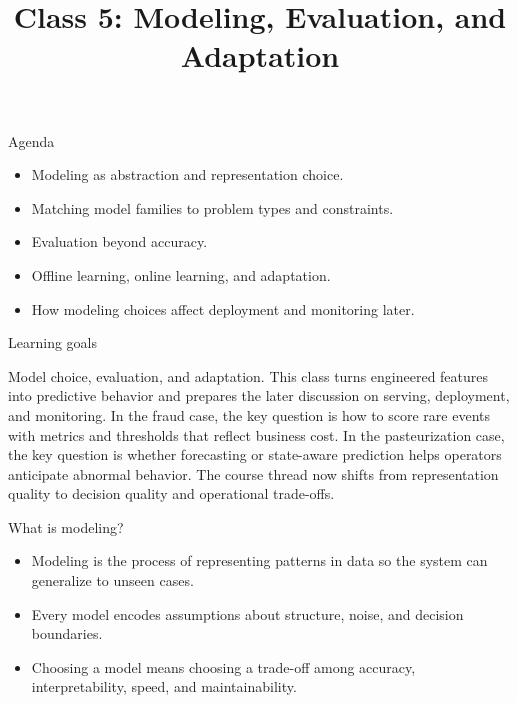 

\title{Class 5: Modeling, Evaluation, and Adaptation}
\author{\coursename}
\date{}



\frame{\titlepage \coursefooter}

\begin{frame}{Agenda}
\begin{itemize}
\item Modeling as abstraction and representation choice.
\item Matching model families to problem types and constraints.
\item Evaluation beyond accuracy.
\item Offline learning, online learning, and adaptation.
\item How modeling choices affect deployment and monitoring later.
\end{itemize}
\coursefooter
\end{frame}

\begin{frame}{Learning goals}
\coursefooter
\end{frame}

\coursecontextframe
{Model choice, evaluation, and adaptation.}
{This class turns engineered features into predictive behavior and prepares the later discussion on serving, deployment, and monitoring.}
{In the fraud case, the key question is how to score rare events with metrics and thresholds that reflect business cost.}
{In the pasteurization case, the key question is whether forecasting or state-aware prediction helps operators anticipate abnormal behavior.}
{The course thread now shifts from representation quality to decision quality and operational trade-offs.}

\begin{frame}{What is modeling?}
\begin{itemize}
\item Modeling is the process of representing patterns in data so the system can generalize to unseen cases.
\item Every model encodes assumptions about structure, noise, and decision boundaries.
\item Choosing a model means choosing a trade-off among accuracy, interpretability, speed, and maintainability.
\end{itemize}
\coursefooter
\end{frame}


